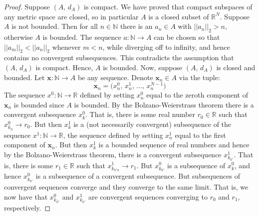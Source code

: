 \documentclass{article}
\theoremstyle{plain}
\theoremstyle{normal}
\begin{document}
        \begin{proof}
            Suppose $(A,\,d_{A})$ is compact. We have proved that compact
            subspaces of any metric space are closed, so in particular
            $A$ is a closed subset of $\mathbb{R}^{N}$. Suppose $A$ is not
            bounded. Then for all $n\in\mathbb{N}$ there is an
            $a_{n}\in{A}$ with $||a_{n}||_{2}>n$, otherwise
            $A$ is bounded. The sequence $a:\mathbb{N}\rightarrow{A}$ can be
            chosen so that $||a_{m}||_{2}<||a_{n}||_{2}$ whenever $m<n$, while
            diverging off to infinity, and hence contains no
            convergent subsequences. This contradicts the assumption that
            $(A,\,d_{A})$ is compact. Hence, $A$ is bounded. Now, suppose
            $(A,\,d_{A})$ is closed and bounded. Let
            $\mathbf{x}:\mathbb{N}\rightarrow{A}$ be any sequence. Denote
            $\mathbf{x}_{n}\in{A}$ via the tuple:
            \begin{equation}
                \mathbf{x}_{n}=\big(x_{n}^{0},\,x_{n}^{1},\,\dots,\,
                    x_{n}^{N-1}\big)
            \end{equation}
            The sequence $x^{0}:\mathbb{N}\rightarrow\mathbb{R}$ defined by
            setting $x_{n}^{0}$ equal to the zeroth component of
            $\mathbf{x}_{n}$ is bounded since $A$ is bounded. By
            the Bolzano-Weierstrass theorem there is a
            convergent subsequence $x_{k}^{0}$. That is, there is some
            real number $r_{0}\in\mathbb{R}$ such that
            $x_{k_{n}}^{0}\rightarrow{r}_{0}$. But then
            $x_{k}^{1}$ is a (not necessarily convergent) subsequence of the
            sequence $x^{1}:\mathbb{N}\rightarrow\mathbb{R}$, the sequence
            defined by setting $x_{n}^{1}$ equal to the first component of
            $\mathbf{x}_{n}$. But then $x_{k}^{1}$ is a bounded sequence of
            real numbers and hence by the Bolzano-Weierstrass theorem, there
            is a convergent subsequence $x_{k_{k'}}^{1}$. That is, there is
            some $r_{1}\in\mathbb{R}$ such that
            $x_{k_{k'n}}^{1}\rightarrow{r}_{1}$. But
            $x_{k_{k'}}^{0}$ is a subsequence of $x_{k}^{0}$, and hence
            $x_{k_{k'}}^{0}$ is a subsequence of a convergent subsequence.
            But subsequences of convergent sequences converge and they converge
            to the same limit. That is, we now have that
            $x_{k_{k'}}^{0}$ and $x_{k_{k'}}^{1}$ are convergent sequences
            converging to $r_{0}$ and $r_{1}$, respectively.

\end{proof}
\end{document}
